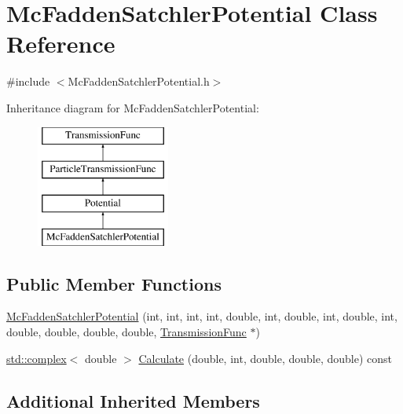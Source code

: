 \hypertarget{classMcFaddenSatchlerPotential}{\section{Mc\-Fadden\-Satchler\-Potential Class Reference}
\label{classMcFaddenSatchlerPotential}
}


{\ttfamily \#include $<$Mc\-Fadden\-Satchler\-Potential.\-h$>$}

Inheritance diagram for Mc\-Fadden\-Satchler\-Potential\-:\begin{figure}[H]
\begin{center}
\leavevmode
\includegraphics[height=4.000000cm]{da/d23/classMcFaddenSatchlerPotential}
\end{center}
\end{figure}
\subsection*{Public Member Functions}
\begin{DoxyCompactItemize}
\item 
\hyperlink{classMcFaddenSatchlerPotential_a24246503ca1d2d9931e93b00099e1577}{Mc\-Fadden\-Satchler\-Potential} (int, int, int, int, double, int, double, int, double, int, double, double, double, double, \hyperlink{classTransmissionFunc}{Transmission\-Func} $\ast$)
\item 
\hyperlink{Constants_8h_a1c1b16cc02d518bbe753449171ab7033}{std\-::complex}$<$ double $>$ \hyperlink{classMcFaddenSatchlerPotential_abbdff953b8577365fc0b60844d51ea4b}{Calculate} (double, int, double, double, double) const 
\end{DoxyCompactItemize}
\subsection*{Additional Inherited Members}


